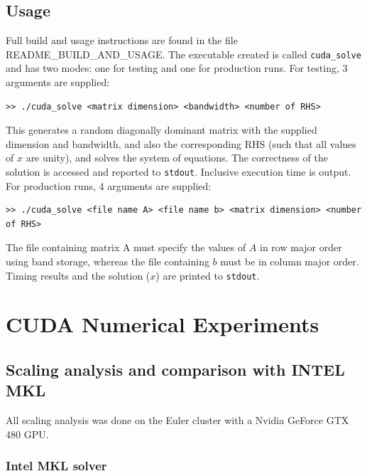 \documentclass[12pt]{article}
\begin{document}
\subsection{Usage} 
\label{usage} 

Full build and usage instructions are found in
the file README\_BUILD\_AND\_USAGE. The executable created is called
\texttt{cuda\_solve} and has two modes: one for testing and one for production
runs. For testing, 3 arguments are supplied: 

\begin{verbatim}
>> ./cuda_solve <matrix dimension> <bandwidth> <number of RHS> \end{verbatim}

This generates a random diagonally dominant matrix with the supplied dimension
and bandwidth, and also the corresponding RHS (such that all values of $x$ are
unity), and solves the system of equations. The correctness of the solution is
accessed and reported to \texttt{stdout}. Inclusive execution time is output. For production runs, 4
arguments are supplied:

\begin{verbatim}
>> ./cuda_solve <file name A> <file name b> <matrix dimension> <number of RHS>
\end{verbatim}

The file containing matrix A must specify the values of $A$ in row major order
using band storage, whereas the file containing $b$ must be in column major
order. Timing results and the solution ($x$) are printed to \texttt{stdout}.


\section{CUDA Numerical Experiments} 
\label{sec:numericalexperiments}

\subsection{Scaling analysis and comparison with INTEL MKL}

All scaling analysis was done on the Euler cluster with a Nvidia GeForce GTX 480 GPU.

\subsubsection{Intel MKL solver} 
\end{document}

